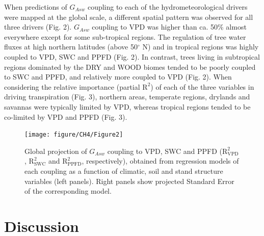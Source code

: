 \documentclass[11pt,twoside]{reedthesis}
\begin{document}
When predictions of \(G_{Asw}\) coupling to each of the
hydrometeorological drivers were mapped at the global scale, a different
spatial pattern was observed for all three drivers (Fig. 2). \(G_{Asw}\)
coupling to VPD was higher than ca. 50\% almost everywhere except for
some sub-tropical regions. The regulation of tree water fluxes at high
northern latitudes (above 50\(^{\circ}\) N) and in tropical regions was
highly coupled to VPD, SWC and PPFD (Fig. 2). In contrast, trees living
in subtropical regions dominated by the DRY and WOOD biomes tended to be
poorly coupled to SWC and PPFD, and relatively more coupled to VPD (Fig.
2). When considering the relative importance (partial \(\text{R}^2\)) of
each of the three variables in driving transpiration (Fig. 3), northern
areas, temperate regions, drylands and savannas were typically limited
by VPD, whereas tropical regions tended to be co-limited by VPD and PPFD
(Fig. 3).\par
\begin{figure}[hbt!]

{\centering \texttt{[image: figure/CH4/Figure2]} 

}

\caption[Global projection of $G_{Asw}$ coupling to VPD, SWC and PPFD.]{Global projection of $G_{Asw}$ coupling to VPD, SWC and PPFD ($\text{R}^2_{\text{VPD}}$, $\text{R}^2_{\text{SWC}}$ and $\text{R}^2_{\text{PPFD}}$, respectively), obtained from regression models of each coupling as a function of climatic, soil and stand structure variables (left panels). Right panels show projected Standard Error of the corresponding model.}\label{fig:ch4fig2}
\end{figure}
\section{Discussion}\label{discussion}
\end{document}
